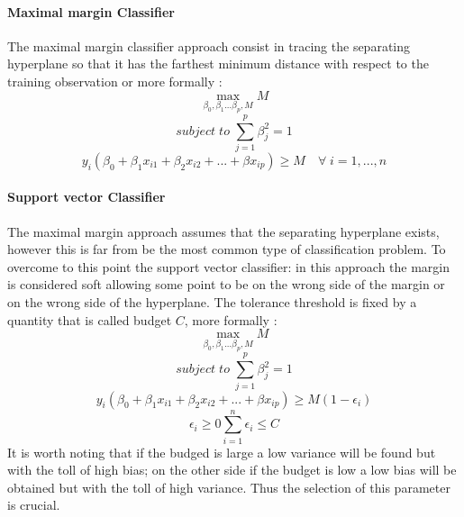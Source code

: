 \documentclass[
12pt, %
a4paper, %
oneside, %
headinclude,footinclude, %
BCOR5mm, %
]{scrartcl}
\begin{document}
\paragraph{Maximal margin Classifier}
The maximal margin classifier approach consist in tracing the separating hyperplane so that it has the  farthest minimum distance with respect to the training observation or more formally \cite{james2013introduction}: 
\begin{equation}
\max\limits_{{\beta_{0},\beta_{1}...\beta_{p},M}} M
\end{equation}
\begin{equation}
subject\;to\;\sum_{j=1}^{p}\beta_{j}^{2}=1
\end{equation}
\begin{equation}
y_{i}\left( \beta_{0} + \beta_{1} x_{i1} + \beta_{2} x_{i2}+...+\beta x_{ip}\right)\geq M\quad\forall\; i=1,...,n
\end{equation}
\paragraph{Support vector Classifier}
The maximal margin approach assumes that the separating hyperplane exists, however this is far from be the most common type of classification problem. To overcome to this point the support vector classifier: in this approach the margin is considered soft allowing some point to be on the wrong side of the margin or on the wrong side of the hyperplane. The tolerance threshold is fixed by a quantity that is called budget $C$, more formally \cite{james2013introduction}:
\begin{equation}
\max\limits_{{\beta_{0},\beta_{1}...\beta_{p},M}} M
\end{equation}
\begin{equation}
subject\;to\;\sum_{j=1}^{p}\beta_{j}^{2}=1
\end{equation}
\begin{equation}
y_{i}\left( \beta_{0} + \beta_{1} x_{i1} + \beta_{2} x_{i2}+...+\beta x_{ip}\right)\geq M\left(1-\epsilon_{i}\right)
\end{equation}
\begin{equation}
\epsilon_{i}\geq 0 \sum_{i=1}^{n}\epsilon_{i}\leq C
\end{equation}
It is worth noting that if the budged is large a low variance will be found but with the toll of high bias; on the other side if the budget is low a low bias will be obtained but with the toll of high variance. Thus the selection of this parameter is crucial.  
\end{document}

